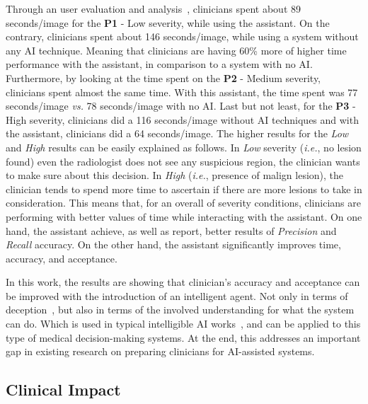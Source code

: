 Through an user evaluation and analysis~\cite{https://doi.org/10.13140/rg.2.2.16566.14403/1}, clinicians spent about 89 seconds/image for the {\bf P1} - Low severity, while using the assistant.
On the contrary, clinicians spent about 146 seconds/image, while using a system without any \ac{AI} technique.
Meaning that clinicians are having 60\% more of higher time performance with the assistant, in comparison to a system with no \ac{AI}.
Furthermore, by looking at the time spent on the {\bf P2} - Medium severity, clinicians spent almost the same time.
With this assistant, the time spent was 77 seconds/image {\it vs.} 78 seconds/image with no \ac{AI}.
Last but not least, for the {\bf P3} - High severity, clinicians did a 116 seconds/image without \ac{AI} techniques and with the assistant, clinicians did a 64 seconds/image.
The higher results for the {\it Low} and {\it High} results can be easily explained as follows.
In {\it Low} severity ({\it i.e.}, no lesion found) even the radiologist does not see any suspicious region, the clinician wants to make sure about this decision.
In {\it High} ({\it i.e.}, presence of malign lesion), the clinician tends to spend more time to ascertain if there are more lesions to take in consideration.
This means that, for an overall of severity conditions, clinicians are performing with better values of time while interacting with the assistant.
On one hand, the assistant achieve, as well as report, better results of {\it Precision} and {\it Recall} accuracy.
On the other hand, the assistant significantly improves time, accuracy, and acceptance.

In this work, the results are showing that clinician's accuracy and acceptance can be improved with the introduction of an intelligent agent.
Not only in terms of deception~\cite{hengstler2016applied}, but also in terms of the involved understanding for what the system can do.
Which is used in typical intelligible \ac{AI} works~\cite{10.1145/3173574.3174156}, and can be applied to this type of medical decision-making systems.
At the end, this addresses an important gap in existing research on preparing clinicians for \ac{AI}-assisted systems.

\subsection{Clinical Impact}
\label{sec:app002007001}

